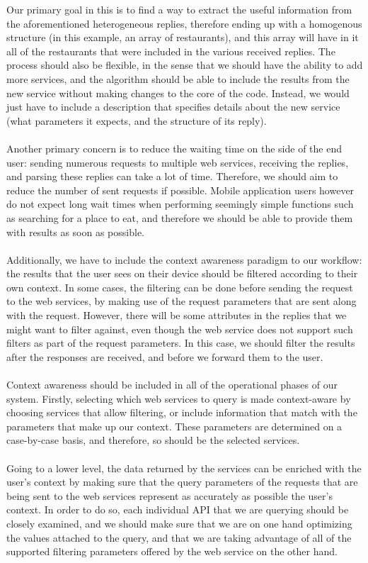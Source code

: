 Our primary goal in this is to find a way to extract the useful information from the aforementioned heterogeneous replies, therefore ending up with a homogenous structure (in this example, an array of restaurants), and this array will have in it all of the restaurants that were included in the various received replies. The process should also be flexible, in the sense that we should have the ability to add more services, and the algorithm should be able to include the results from the new service without making changes to the core of the code. Instead, we would just have to include a description that specifies details about the new service (what parameters it expects, and the structure of its reply).\\\\
Another primary concern is to reduce the waiting time on the side of the end user: sending numerous requests to multiple web services, receiving the replies, and parsing these replies can take a lot of time. Therefore, we should aim to reduce the number of sent requests if possible. Mobile application users however do not expect long wait times when performing seemingly simple functions such as searching for a place to eat, and therefore we should be able to provide them with results as soon as possible.\\\\
Additionally, we have to include the context awareness paradigm to our workflow: the results that the user sees on their device should be filtered according to their own context. In some cases, the filtering can be done before sending the request to the web services, by making use of the request parameters that are sent along with the request. However, there will be some attributes in the replies that we might want to filter against, even though the web service does not support such filters as part of the request parameters. In this case, we should filter the results after the responses are received, and before we forward them to the user.\\\\
Context awareness should be included in all of the operational phases of our system. Firstly, selecting which web services to query is made context-aware by choosing services that allow filtering, or include information that match with the parameters that make up our context. These parameters are determined on a case-by-case basis, and therefore, so should be the selected services.\\\\
Going to a lower level, the data returned by the services can be enriched with the user's context by making sure that the query parameters of the requests that are being sent to the web services represent as accurately as possible the user's context. In order to do so, each individual API that we are querying should be closely examined, and we should make sure that we are on one hand optimizing the values attached to the query, and that we are taking advantage of all of the supported filtering parameters offered by the web service on the other hand.\\\\
